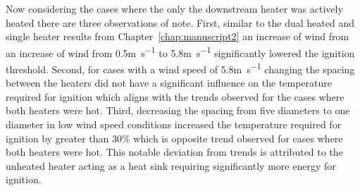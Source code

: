     Now considering the cases where the only the downstream heater was actively heated there are three observations of note. First, similar to the dual heated and single heater results from Chapter~\ref{chap:manuscript2} an increase of wind from an increase of wind from 0.5\si{\meter\per\second} to 5.8\si{\meter\per\second} significantly lowered the ignition threshold. Second, for cases with a wind speed of 5.8\si{\meter\per\second} changing the spacing between the heaters did not have a significant influence on the temperature required for ignition which aligns with the trends observed for the cases where both heaters were hot. Third, decreasing the spacing from five diameters to one diameter in low wind speed conditions increased the temperature required for ignition by greater than 30\% which is opposite trend observed for cases where both heaters were hot. This notable deviation from trends is attributed to the unheated heater acting as a heat sink requiring significantly more energy for ignition. 
    
